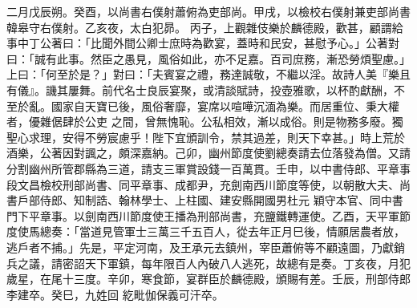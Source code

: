 \begin{pinyinscope}
 二月戊辰朔。癸酉，以尚書右僕射蕭俯為吏部尚。甲戌，以檢校右僕射兼吏部尚書韓皋守右僕射。乙亥夜，太白犯昴。
 丙子，上觀雜伎樂於麟德殿，歡甚，顧謂給事中丁公著曰：「比聞外間公卿士庶時為歡宴，蓋時和民安，甚慰予心。」公著對曰：「誠有此事。然臣之愚見，風俗如此，亦不足嘉。百司庶務，漸恐勞煩聖慮。」上曰：「何至於是？」對曰：「夫賓宴之禮，務達誠敬，不繼以淫。故詩人美『樂且有儀』。譏其屢舞。前代名士良辰宴聚，或清談賦詩，投壺雅歌，以杯酌獻酬，不至於亂。國家自天寶已後，風俗奢靡，宴席以喧嘩沉湎為樂。而居重位、秉大權者，優雜倨肆於公吏
 之間，曾無愧恥。公私相效，漸以成俗。則是物務多廢。獨聖心求理，安得不勞宸慮乎！陛下宜頒訓令，禁其過差，則天下幸甚。」時上荒於酒樂，公著因對諷之，頗深嘉納。己卯，幽州節度使劉總奏請去位落發為僧。又請分割幽州所管郡縣為三道，請支三軍賞設錢一百萬貫。壬申，以中書侍郎、平章事段文昌檢校刑部尚書、同平章事、成都尹，充劍南西川節度等使，以朝散大夫、尚書戶部侍郎、知制誥、翰林學士、上柱國、建安縣開國男杜元
 穎守本官、同中書門下平章事。以劍南西川節度使王播為刑部尚書，充鹽鐵轉運使。乙酉，天平軍節度使馬總奏：「當道見管軍士三萬三千五百人，從去年正月巳後，情願居農者放，逃戶者不捕。」先是，平定河南，及王承元去鎮州，宰臣蕭俯等不顧遠圖，乃獻銷兵之議，請密詔天下軍鎮，每年限百人內破八人逃死，故總有是奏。丁亥夜，月犯歲星，在尾十三度。辛卯，寒食節，宴群臣於麟德殿，頒賜有差。壬辰，刑部侍郎李建卒。癸巳，九姓回
 紇毗伽保義可汗卒。




\end{pinyinscope}
